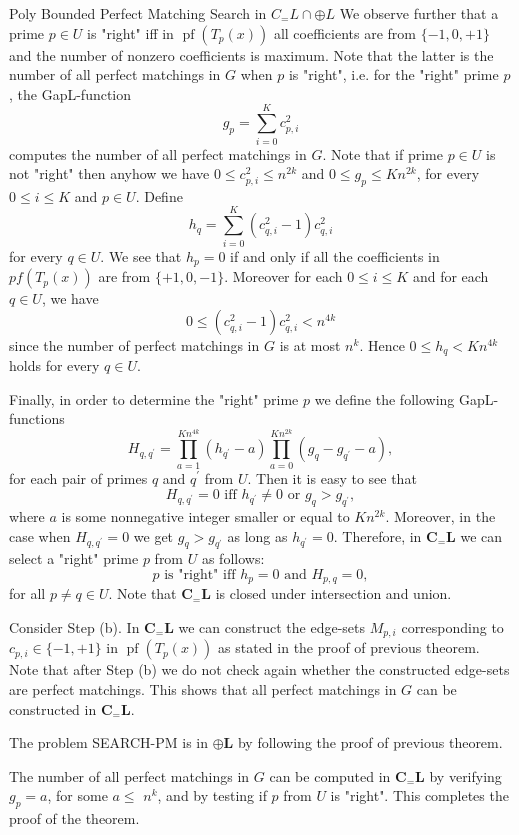 \documentclass{beamer}
\begin{document}
\begin{frame}[allowframebreaks]{Poly Bounded Perfect Matching Search in $C_=L \cap \oplus L$}
	We observe further that a prime $p \in U$ is "right" iff in $\operatorname{pf}\left(T_p(x)\right)$ all coefficients are from $\{-1,0,+1\}$ and the number of nonzero coefficients is maximum. Note that the latter is the number of all perfect matchings in $G$ when $p$ is "right", i.e. for the "right" prime $p$, the GapL-function
	$$
	g_p=\sum_{i=0}^K c_{p, i}^2
	$$
	computes the number of all perfect matchings in $G$. Note that if prime $p \in U$ is not "right" then anyhow we have $0 \leq c_{p, i}^2 \leq n^{2 k}$ and $0 \leq g_p \leq K n^{2 k}$, for every $0 \leq i \leq K$ and $p \in U$.
	Define
	$$
	h_q=\sum_{i=0}^K\left(c_{q, i}^2-1\right) c_{q, i}^2
	$$
	for every $q \in U$. We see that $h_p=0$ if and only if all the coefficients in $pf(T_p(x))$ are from $\{+1,0,-1\}$. Moreover for each 
	$0 \leq i \leq K$ and for each $q \in U$, we have
	$$
	0 \leq\left(c_{q, i}^2-1\right) c_{q, i}^2<n^{4 k}
	$$
	since the number of perfect matchings in $G$ is at most $n^k$. Hence $0 \leq h_q<K n^{4 k}$ holds for every $q \in U$.
	
	Finally, in order to determine the "right" prime $p$ we define the following GapL-functions
	$$
	H_{q, q^{\prime}}=\prod_{a=1}^{K n^{4 k}}\left(h_{q^{\prime}}-a\right) \prod_{a=0}^{K n^{2 k}}\left(g_q-g_{q^{\prime}}-a\right),
	$$
	for each pair of primes $q$ and $q^{\prime}$ from $U$. Then it is easy to see that
	$$
	H_{q, q^{\prime}}=0 \text { iff } h_{q^{\prime}} \neq 0 \text { or } g_q>g_{q^{\prime}},
	$$
	where $a$ is some nonnegative integer smaller or equal to $K n^{2 k}$. Moreover, in the case when $H_{q, q^{\prime}}=0$ we get $g_q>g_{q^{\prime}}$ as long as $h_{q^{\prime}}=0$. Therefore, in $\mathbf{C}_{=} \mathbf{L}$ we can select a "right" prime $p$ from $U$ as follows:
	$$
	p \text { is "right" iff } h_p=0 \text { and } H_{p, q}=0,
	$$
	for all $p \neq q \in U$. Note that $\mathbf{C}_{=} \mathbf{L}$ is closed under intersection and union.
	
	Consider Step (b). In $\mathbf{C}_{=} \mathbf{L}$ we can construct the edge-sets $M_{p, i}$ corresponding to $c_{p, i} \in\{-1,+1\}$ in $\operatorname{pf}\left(T_p(x)\right)$ as stated in the proof of previous theorem. Note that after Step (b) we do not check again whether the constructed edge-sets are perfect matchings. This shows that all perfect matchings in $G$ can be constructed in $\mathbf{C}_{=} \mathbf{L}$.
	
	The problem SEARCH-PM is in $\oplus \mathbf{L}$ by following the proof of previous theorem.
	
	The number of all perfect matchings in $G$ can be computed in $\mathbf{C}_{=} \mathbf{L}$ by verifying $g_p=a$, for some $a \leq$ $n^k$, and by testing if $p$ from $U$ is "right".
	This completes the proof of the theorem.
	
	
\end{frame}
\end{document}
